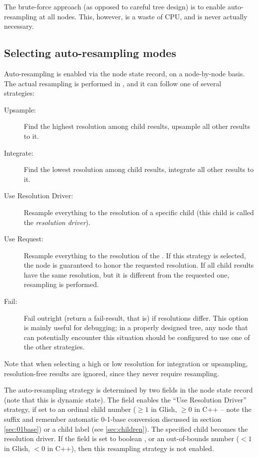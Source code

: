   The brute-force approach (as opposed to careful tree design) is to enable
  auto-resampling at all nodes. This, however, is a waste of CPU, and is never
  actually necessary.

\subsection{Selecting auto-resampling modes}

  Auto-resampling is enabled via the node state record, on a node-by-node
  basis. The actual resampling is performed in , and it can
  follow one of several strategies:

  \begin{description}
  
  \item[Upsample:] Find the highest resolution among child results, upsample
    all other results to it.

  \item[Integrate:] Find the lowest resolution among child results, integrate
    all other results to it.

  \item[Use Resolution Driver:] Resample everything to the resolution of a
    specific child (this child is called the {\em resolution driver}\/).

  \item[Use Request:] Resample everything to the resolution of the \Request. If
    this strategy is selected, the node is guaranteed to honor the requested
    resolution. If all child results have the same resolution, but it is
    different from the requested one, resampling is performed.

  \item[Fail:] Fail outright (return a fail-result, that is) if resolutions
    differ. This option is mainly useful for debugging; in a properly designed
    tree, any node that can potentially encounter this situation should be
    configured to use one of the other strategies.

  \end{description}
  
  Note that when selecting a high or low resolution for integration or
  upsampling, resolution-free results are ignored, since they never require
  resampling.

  The auto-resampling strategy is determined by two fields in the node state
  record (note that this is dynamic state). The 
  field enables the ``Use Resolution Driver'' strategy, if set to an ordinal
  child number ($\ge 1$ in Glish, $\ge 0$ in C++ -- note the  suffix
  and remember automatic 0-1-base conversion discussed in section
  \ref{sec:01base}) or a  child label (see \ref{sec:children}). The
  specified child becomes the resolution driver. If the field is set to boolean
  , or an out-of-bounds number ($<1$ in Glish, $<0$ in C++), then
  this resampling strategy is not enabled.

